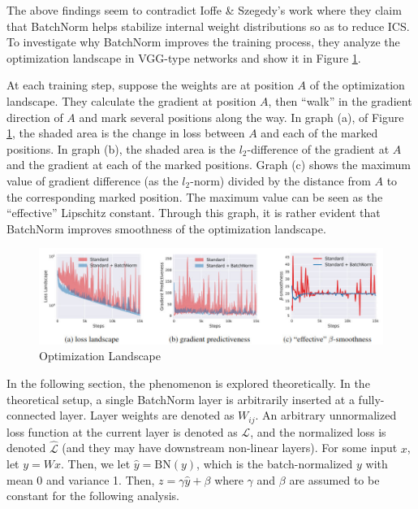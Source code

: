 \documentclass{article}
\begin{document}
The above findings seem to contradict Ioffe \& Szegedy's work \cite{batchnorm} where they claim that BatchNorm helps stabilize internal weight distributions so as to reduce ICS. To investigate why BatchNorm improves the training process, they analyze the optimization landscape in VGG-type networks and show it in Figure \ref{fig:optimizationlandscape}.

\textbf{}

At each training step, suppose the weights are at position $A$ of the optimization landscape. They calculate the gradient at position $A$, then ``walk'' in the gradient direction of $A$ and mark several positions along the way. In graph (a), of Figure \ref{fig:optimizationlandscape}, the shaded area is the change in loss between $A$ and each of the marked positions. In graph (b), the shaded area is the $l_2$-difference of the gradient at $A$ and the gradient at each of the marked positions. Graph (c) shows the maximum value of gradient difference (as the $l_2$-norm) divided by the distance from $A$ to the corresponding marked position. The maximum value can be seen as the ``effective'' Lipschitz constant. Through this graph, it is rather evident that BatchNorm improves smoothness of the optimization landscape.

\begin{figure}[h]
	\centering
    \includegraphics[width=\textwidth]{pics/batchNorm/Santurkar_fig4.jpg}
	\caption{Optimization Landscape}
	\label{fig:optimizationlandscape}
\end{figure}

In the following section, the phenomenon is explored theoretically. In the theoretical setup, a single BatchNorm layer is arbitrarily inserted at a fully-connected layer. Layer weights are denoted as $W_{ij}$. An arbitrary unnormalized loss function at the current layer is denoted as $\mathcal{L}$, and the normalized loss is denoted $\hat{\mathcal{L}}$ (and they may have downstream non-linear layers). For some input $x$, let $y=Wx$. Then, we let $\hat{y}=\text{BN}(y)$, which is the batch-normalized $y$ with mean 0 and variance 1. Then, $z=\gamma\hat{y}+\beta$ where $\gamma$ and $\beta$ are assumed to be constant for the following analysis. 
\end{document}
